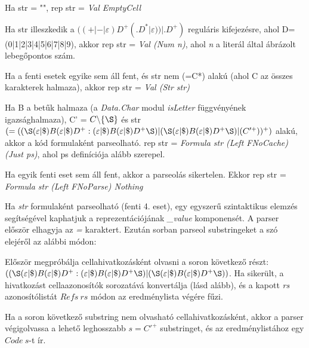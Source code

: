 \begin{compactenum}
	\item Ha str = "", rep str = \textit{Val EmptyCell}
	\item Ha str illeszkedik a $((+|-|\varepsilon)D^+(.D^*|\varepsilon))|.D^+)$ reguláris kifejezésre, ahol D=(0|1|2|3|4|5|6|7|8|9), akkor rep str = \textit{Val (Num n)}, ahol \textit{n} a literál által ábrázolt lebegőpontos szám. 
	\item Ha a fenti esetek egyike sem áll fent, és str nem (=C*) alakú (ahol C az összes karakterek halmaza), akkor rep str = \textit{Val (Str str)}
	\item Ha B a betűk halmaza (a \textit{Data.Char} modul \textit{isLetter} függvényének igazsághalmaza), C' = $C \backslash \{\S\}$ és str \mbox{$(=((\S  (\varepsilon|\$)B(\varepsilon|\$)D^+:(\varepsilon|\$)B(\varepsilon|\$)D^+\S )|(\S (\varepsilon|\$)B(\varepsilon|\$)D^+\S )|(C'^+))^+)$} alakú, akkor a kód formulaként parseolható. rep str = \textit{Formula str (Left FNoCache) (Just ps)}, ahol ps definíciója alább szerepel.
	\item Ha egyik fenti eset sem áll fent, akkor a parseolás sikertelen. Ekkor rep str = \textit{Formula str (Left FNoParse) Nothing}
\end{compactenum}

Ha \textit{str} formulaként parseolható (fenti 4. eset), egy egyszerű szintaktikus elemzés segítségével kaphatjuk a reprezentációjának \textit{\_value} komponensét. A parser először elhagyja az \textit{=} karaktert. Ezután sorban parseol substringeket a szó elejéről az alábbi módon:
\begin{compactenum}
	\item Először megpróbálja cellahivatkozásként olvasni a soron következő részt: $((\S  (\varepsilon|\$)B(\varepsilon|\$)D^+:(\varepsilon|\$)B(\varepsilon|\$)D^+\S )|(\S (\varepsilon|\$)B(\varepsilon|\$)D^+\S ))$. Ha sikerült, a hivatkozást cellaazonosítók sorozatává konvertálja (lásd alább), és a kapott \textit{rs} azonosítólistát $Refs\ rs$ módon az eredménylista végére fűzi.
	\item Ha a soron következő substring nem olvasható cellahivatkozásként, akkor a parser végigolvassa a lehető leghosszabb $s = C'^+$ substringet, és az eredménylistához egy $Code\ s$-t ír.
\end{compactenum}

